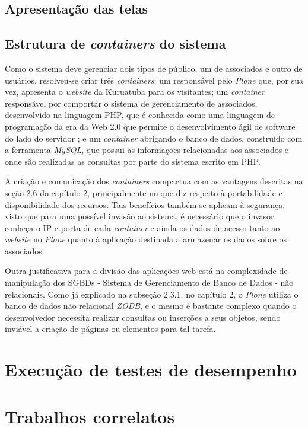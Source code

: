 \hspace{2.5cm}
\subsection{Apresentação das telas}
\label{subsec:telas}
\hspace{2.5cm}

\hspace{2.5cm}
\subsection{Estrutura de \textit{containers} do sistema}
\label{subsec:docker}
\hspace{2.5cm}

Como o sistema deve gerenciar dois tipos de público, um de associados e outro de usuários, resolveu-se criar três \textit{containers}: um responsável pelo \textit{Plone} que, por sua vez, apresenta o \textit{website} da Kuruatuba para os visitantes; um \textit{container} responsável por comportar o sistema de gerenciamento de associados, desenvolvido na linguagem PHP, que é conhecida como uma linguagem de programação da era da Web 2.0 que permite o desenvolvimento ágil de software do lado do servidor ; e um \textit{container} abrigando o banco de dados, construído com a ferramenta \textit{MySQL}, que possui as informações relacionadas aos associados e onde são realizadas as consultas por parte do sistema escrito em PHP.

A criação e comunicação dos \textit{containers} compactua com as vantagens descritas na seção 2.6 do capítulo 2, principalmente no que diz respeito à portabilidade e disponibilidade dos recursos. Tais benefícios também se aplicam à segurança, visto que para uma possível invasão ao sistema, é necessário que o invasor conheça o IP e porta de cada \textit{container} e ainda os dados de acesso tanto ao \textit{website} no \textit{Plone} quanto à aplicação destinada a armazenar os dados sobre os associados.   

Outra justificativa para a divisão das aplicações web está na complexidade de manipulação dos SGBDs - Sistema de Gerenciamento de Banco de Dados - não relacionais. Como já explicado na subseção 2.3.1, no capítulo 2, o \textit{Plone} utiliza o banco de dados não relacional \textit{ZODB}, e o mesmo é bastante complexo quando o desenvolvedor necessita realizar consultas ou inserções a seus objetos, sendo inviável a criação de páginas ou elementos para tal tarefa.  

\hspace{2.5cm}
\section{Execução de testes de desempenho}
\label{sec:testes}
\hspace{2.5cm}

\hspace{2.5cm}
\section{Trabalhos correlatos}
\hspace{2.5cm}
